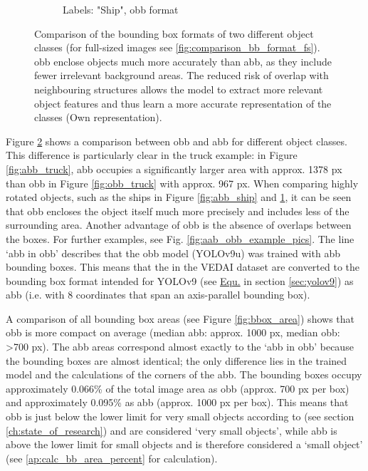 \begin{figure}[h]
\begin{subfigure}[b]{0.45\textwidth}
        \caption{Labels: "Ship", obb format}
        \label{fig:obb_ship}
    \end{subfigure}  
    \caption[Comparison of the bounding box formats of two different object classes]{Comparison of the bounding box formats of two different object classes (for full-sized images see \ref{fig:comparison_bb_format_fs}). \acrshort{obb} enclose objects much more accurately than \acrshort{abb}, as they include fewer irrelevant background areas. The reduced risk of overlap with neighbouring structures allows the model to extract more relevant object features and thus learn a more accurate representation of the classes (Own representation).
}
    \label{fig:comparison_bb_format}
\end{figure}


Figure \ref{fig:comparison_bb_format} shows a comparison between \acrshort{obb} and \acrshort{abb} for different object classes. This difference is particularly clear in the truck example: in Figure \ref{fig:abb_truck}, \acrshort{abb} occupies a significantly larger area with approx. 1378 px than \acrshort{obb} in Figure \ref{fig:obb_truck} with approx. 967 px. When comparing highly rotated objects, such as the ships in Figure \ref{fig:abb_ship} and \ref{fig:obb_ship}, it can be seen that \acrshort{obb} encloses the object itself much more precisely and includes less of the surrounding area. Another advantage of \acrshort{obb} is the absence of overlaps between the boxes. For further examples, see Fig. \ref{fig:aab_obb_example_pics}. The line ‘abb in obb’ describes that the \acrshort{obb} model (\acrshort{YOLO}v9u) was trained with \acrshort{abb} bounding boxes. This means that the  in the \acrshort{VEDAI} dataset are converted to the bounding box format intended for \acrshort{YOLO}v9 (see \hyperlink{eq:yolov9u} {Equ.} in section \ref{sec:yolov9}) as \acrshort{abb} (i.e. with 8 coordinates that span an axis-parallel bounding box).
 

A comparison of all bounding box areas (see Figure \ref{fig:bbox_area}) shows that \acrshort{obb} is more compact on average (median \acrshort{abb}: approx. 1000 px, median \acrshort{obb}: >700 px). The \acrshort{abb} areas correspond almost exactly to the ‘abb in obb’ because the bounding boxes are almost identical; the only difference lies in the trained model and the calculations of the corners of the \acrshort{abb}. The bounding boxes occupy approximately 0.066\% of the total image area as \acrshort{obb} (approx. 700 px per box) and approximately 0.095\% as \acrshort{abb} (approx. 1000 px per box). This means that \acrshort{obb} is just below the lower limit for very small objects according to \citeauthor {Chen2017} \cite{Chen2017} (see section \ref{ch:state_of_research}) and are considered ‘very small objects’, while \acrshort{abb} is above the lower limit for small objects and is therefore considered a ‘small object’ (see \ref{ap:calc_bb_area_percent} for calculation).





